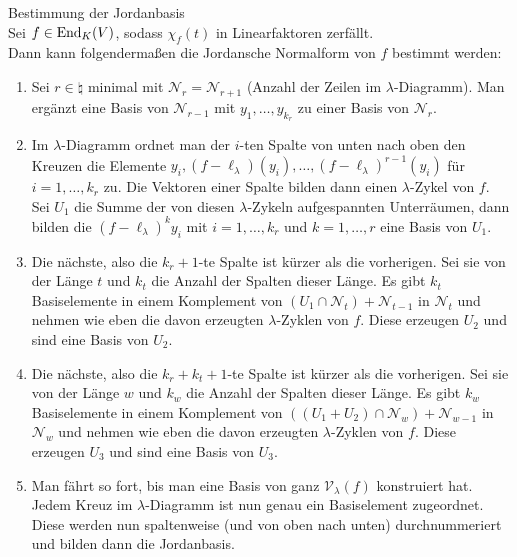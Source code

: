 \begin{Prozedur}{Bestimmung der Jordanbasis} \\
    Sei $f \in \operatorname{End}_K(V)$, sodass $\chi_f(t)$ in Linearfaktoren zerfällt. \\
    Dann kann folgendermaßen die Jordansche Normalform von
    $f$ bestimmt werden:
    \begin{enumerate}
        \item
        Sei $r \in \natural$ minimal mit $\mathcal{N}_r = \mathcal{N}_{r+1}$
        (Anzahl der Zeilen im $\lambda$-Diagramm).
        Man ergänzt eine Basis von $\mathcal{N}_{r-1}$ mit
        $y_1, \dotsc, y_{k_r}$  zu einer Basis von $\mathcal{N}_r$.

        \item
        Im $\lambda$-Diagramm ordnet man der $i$-ten Spalte von unten nach
        oben den Kreuzen die Elemente
        $y_i, (f - \ell_\lambda)(y_i), \dotsc, (f - \ell_\lambda)^{r-1}(y_i)$
        für $i = 1, \dotsc, k_r$ zu.
        Die Vektoren einer Spalte bilden dann einen $\lambda$-Zykel von $f$.
        Sei $U_1$ die Summe der von diesen $\lambda$-Zykeln aufgespannten
        Unterräumen, dann bilden die $(f - \ell_\lambda)^k y_i$
        mit $i = 1, \dotsc, k_r$ und $k = 1, \dotsc, r$ eine Basis von $U_1$.

        \item
        Die nächste, also die $k_r + 1$-te Spalte ist kürzer als die
        vorherigen.
        Sei sie von der Länge $t$ und $k_t$ die Anzahl der Spalten dieser
        Länge.
        Es gibt $k_t$ Basiselemente in einem Komplement von
        $(U_1 \cap \mathcal{N}_t) + \mathcal{N}_{t-1}$ in $\mathcal{N}_t$
        und nehmen wie eben die davon erzeugten $\lambda$-Zyklen von $f$.
        Diese erzeugen $U_2$ und sind eine Basis von $U_2$.

        \item
        Die nächste, also die $k_r + k_t + 1$-te Spalte ist kürzer als die
        vorherigen.
        Sei sie von der Länge $w$ und $k_w$ die Anzahl der Spalten dieser
        Länge.
        Es gibt $k_w$ Basiselemente in einem Komplement
        von $((U_1 + U_2) \cap \mathcal{N}_w) + \mathcal{N}_{w-1}$
        in $\mathcal{N}_w$
        und nehmen wie eben die davon erzeugten $\lambda$-Zyklen von $f$.
        Diese erzeugen $U_3$ und sind eine Basis von $U_3$.

        \item
        Man fährt so fort, bis man eine Basis von ganz
        $\mathcal{V}_\lambda(f)$ konstruiert hat.
        Jedem Kreuz im $\lambda$-Diagramm ist nun genau ein Basiselement
        zugeordnet.
        Diese werden nun spaltenweise (und von oben nach unten)
        durchnummeriert und bilden dann die Jordanbasis.
    \end{enumerate}
\end{Prozedur}

